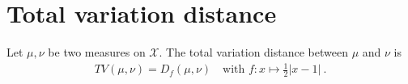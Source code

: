 \chapter{Total variation distance}

\begin{definition}[TV distance]
  \label{def:TV}
    Let $\mu, \nu$ be two measures on $\mathcal X$. The total variation distance between $\mu$ and $\nu$ is
  \begin{align*}
    TV(\mu, \nu) = D_f(\mu, \nu) \quad \text{with } f: x \mapsto \frac{1}{2}\vert x - 1 \vert \: .
  \end{align*}
\end{definition}